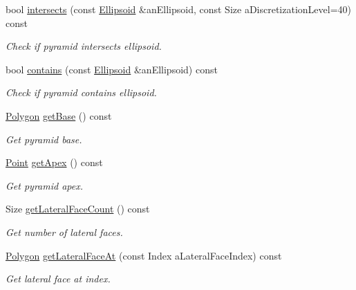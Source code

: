 \begin{DoxyCompactItemize}
bool \hyperlink{classlibrary_1_1math_1_1geom_1_1d3_1_1objects_1_1_pyramid_a7a79fd414bea507272e6c88ed66eeba8}{intersects} (const \hyperlink{classlibrary_1_1math_1_1geom_1_1d3_1_1objects_1_1_ellipsoid}{Ellipsoid} \&an\+Ellipsoid, const Size a\+Discretization\+Level=40) const
\begin{DoxyCompactList}\small\item\em Check if pyramid intersects ellipsoid. \end{DoxyCompactList}\item 
bool \hyperlink{classlibrary_1_1math_1_1geom_1_1d3_1_1objects_1_1_pyramid_a32e8fd53701cd4d2c0c6b377ca7902c9}{contains} (const \hyperlink{classlibrary_1_1math_1_1geom_1_1d3_1_1objects_1_1_ellipsoid}{Ellipsoid} \&an\+Ellipsoid) const
\begin{DoxyCompactList}\small\item\em Check if pyramid contains ellipsoid. \end{DoxyCompactList}\item 
\hyperlink{classlibrary_1_1math_1_1geom_1_1d3_1_1objects_1_1_polygon}{Polygon} \hyperlink{classlibrary_1_1math_1_1geom_1_1d3_1_1objects_1_1_pyramid_a247e3c188d7919b2043e59d46b67c2ef}{get\+Base} () const
\begin{DoxyCompactList}\small\item\em Get pyramid base. \end{DoxyCompactList}\item 
\hyperlink{classlibrary_1_1math_1_1geom_1_1d3_1_1objects_1_1_point}{Point} \hyperlink{classlibrary_1_1math_1_1geom_1_1d3_1_1objects_1_1_pyramid_af24d52592c3154d633f694411d11396c}{get\+Apex} () const
\begin{DoxyCompactList}\small\item\em Get pyramid apex. \end{DoxyCompactList}\item 
Size \hyperlink{classlibrary_1_1math_1_1geom_1_1d3_1_1objects_1_1_pyramid_ac208d0799c3180c01db9d5d988d73118}{get\+Lateral\+Face\+Count} () const
\begin{DoxyCompactList}\small\item\em Get number of lateral faces. \end{DoxyCompactList}\item 
\hyperlink{classlibrary_1_1math_1_1geom_1_1d3_1_1objects_1_1_polygon}{Polygon} \hyperlink{classlibrary_1_1math_1_1geom_1_1d3_1_1objects_1_1_pyramid_a36f5527c9708f2d44fdddaf7c9ac5ea0}{get\+Lateral\+Face\+At} (const Index a\+Lateral\+Face\+Index) const
\begin{DoxyCompactList}\small\item\em Get lateral face at index. \end{DoxyCompactList}\item 

\end{DoxyCompactItemize}
